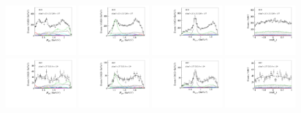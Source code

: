 \begin{figure}[htbp]\centering
    \includegraphics[width=0.24\textwidth]{figure/pwa_nominal/s0_m_R_BC.pdf}
    \includegraphics[width=0.24\textwidth]{figure/pwa_nominal/s0_m_R_BD.pdf}
    \includegraphics[width=0.24\textwidth]{figure/pwa_nominal/s0_m_R_CD.pdf}
    \includegraphics[width=0.24\textwidth]{figure/pwa_nominal/s0_epemDSID_Lmdc_cos_beta.pdf} \\
    \includegraphics[width=0.24\textwidth]{figure/pwa_nominal/s1_m_R_BC.pdf}
    \includegraphics[width=0.24\textwidth]{figure/pwa_nominal/s1_m_R_BD.pdf}
    \includegraphics[width=0.24\textwidth]{figure/pwa_nominal/s1_m_R_CD.pdf}
    \includegraphics[width=0.24\textwidth]{figure/pwa_nominal/s1_epemDSID_Lmdc_cos_beta.pdf} \\

\end{figure}

